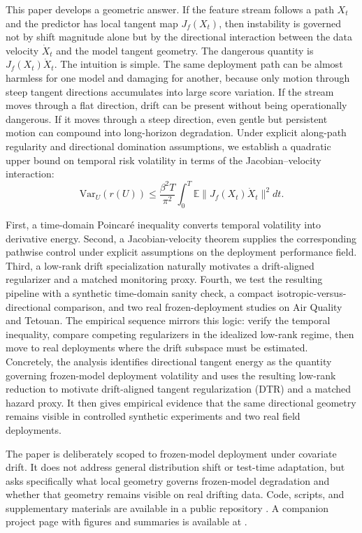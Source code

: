 \documentclass[conference]{IEEEtran}
\newcommand{\E}{\mathbb{E}}
\newcommand{\Var}{\mathrm{Var}}
\begin{document}
This paper develops a geometric answer. If the feature stream follows a path $X_t$ and the predictor has local tangent map $J_f(X_t)$, then instability is governed not by shift magnitude alone but by the directional interaction between the data velocity $\dot X_t$ and the model tangent geometry. The dangerous quantity is $J_f(X_t)\dot X_t$. The intuition is simple. The same deployment path can be almost harmless for one model and damaging for another, because only motion through steep tangent directions accumulates into large score variation. If the stream moves through a flat direction, drift can be present without being operationally dangerous. If it moves through a steep direction, even gentle but persistent motion can compound into long-horizon degradation. Under explicit along-path regularity and directional domination assumptions, we establish a quadratic upper bound on temporal risk volatility in terms of the Jacobian--velocity interaction:
\[
\Var_U(r(U)) \le \frac{\beta^2 T}{\pi^2}\int_0^T \E\|J_f(X_t)\dot X_t\|^2dt.
\]

First, a time-domain Poincar\'e inequality converts temporal volatility into derivative energy. Second, a Jacobian-velocity theorem supplies the corresponding pathwise control under explicit assumptions on the deployment performance field. Third, a low-rank drift specialization naturally motivates a drift-aligned regularizer and a matched monitoring proxy. Fourth, we test the resulting pipeline with a synthetic time-domain sanity check, a compact isotropic-versus-directional comparison, and two real frozen-deployment studies on Air Quality and Tetouan. The empirical sequence mirrors this logic: verify the temporal inequality, compare competing regularizers in the idealized low-rank regime, then move to real deployments where the drift subspace must be estimated. Concretely, the analysis identifies directional tangent energy as the quantity governing frozen-model deployment volatility and uses the resulting low-rank reduction to motivate drift-aligned tangent regularization (DTR) and a matched hazard proxy. It then gives empirical evidence that the same directional geometry remains visible in controlled synthetic experiments and two real field deployments.

The paper is deliberately scoped to frozen-model deployment under covariate drift. It does not address general distribution shift or test-time adaptation, but asks specifically what local geometry governs frozen-model degradation and whether that geometry remains visible on real drifting data.
Code, scripts, and supplementary materials are available in a public repository \cite{landers-repo}. A companion project page with figures and summaries is available at \cite{landers-site}.
\end{document}
